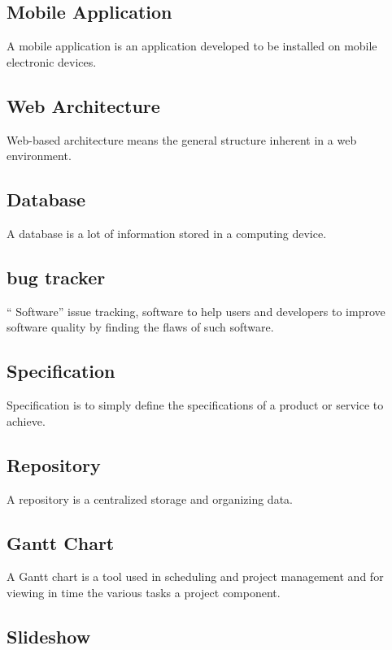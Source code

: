 \documentclass{life-fr}
\begin{document}
\subsection {Mobile Application}

A mobile application is an application developed to be installed on mobile electronic devices.

\subsection {Web Architecture}

Web-based architecture means the general structure inherent in a web environment.

\subsection {Database}

A database is a lot of information stored in a computing device.

\subsection {bug tracker}

`` Software'' issue tracking, software to help users and developers to improve software quality by finding the flaws of such software.

\subsection {Specification}

Specification is to simply define the specifications of a product or service to achieve.

\subsection {Repository}

A repository is a centralized storage and organizing data.

\subsection {Gantt Chart}

A Gantt chart is a tool used in scheduling and project management and for viewing in time the various tasks a project component.

\subsection {Slideshow}
\end{document}
